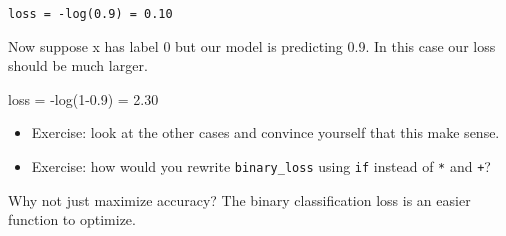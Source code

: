 \documentclass[11pt]{article}
\providecommand{\tightlist}{%
      \setlength{\itemsep}{0pt}\setlength{\parskip}{0pt}}
\begin{document}
\texttt{loss\ =\ -log(0.9)\ =\ 0.10}

Now suppose x has label 0 but our model is predicting 0.9. In this case
our loss should be much larger.

loss = -log(1-0.9) = 2.30

\begin{itemize}
\tightlist
\item
  Exercise: look at the other cases and convince yourself that this make
  sense.
\item
  Exercise: how would you rewrite \texttt{binary\_loss} using
  \texttt{if} instead of \texttt{*} and \texttt{+}?
\end{itemize}

Why not just maximize accuracy? The binary classification loss is an
easier function to optimize.


    
    
    
    
\end{document}
